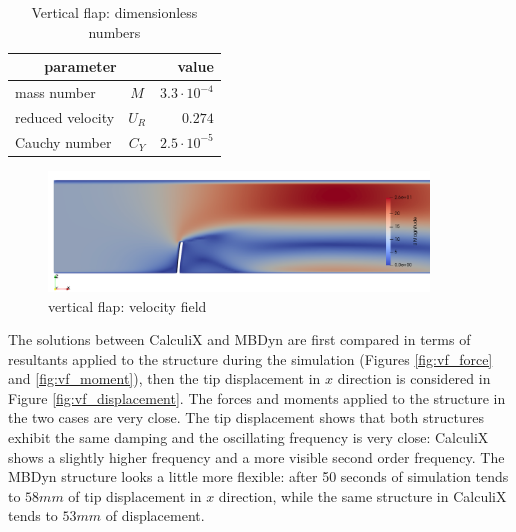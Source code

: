 \begin{table}[!htb]
	\begin{center}
		\begin{tabular}{ l c | r } 
			\multicolumn{2}{c|}{parameter} & value   \\ 
			\hline
			mass number  & $M$ & $3.3\cdot 10^{-4}$     \\
			reduced velocity & $U_R$ & $0.274$  \\
			Cauchy number  & $C_Y$ & $2.5\cdot 10^{-5}$  \\			
		\end{tabular}
	\end{center}
	\caption{Vertical flap: dimensionless numbers}
	\label{table:ex1-adim}
\end{table}

\begin{figure}[htbp!]
	\centering
	\includegraphics[width=0.9\textwidth]{images/vert_flap/vert_flap1.png}
	\caption{vertical flap: velocity field}
	\label{fig:vf_sol}
\end{figure}


The solutions between CalculiX and MBDyn are first compared in terms of resultants applied to the structure during the simulation (Figures \ref{fig:vf_force} and \ref{fig:vf_moment}), then the tip displacement in $x$ direction is considered in Figure \ref{fig:vf_displacement}. The forces and moments applied to the structure in the two cases are very close. 
The tip displacement shows that both structures exhibit the same damping and the oscillating frequency is very close: CalculiX shows a slightly higher frequency and a more visible second order frequency. The MBDyn structure looks a little more flexible: after 50 seconds of simulation tends to $58mm$ of tip displacement in $x$ direction, while the same structure in CalculiX tends to $53mm$ of displacement. 

